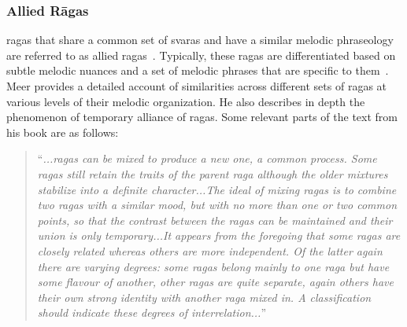 \subsubsection{Allied R\={a}gas}
\label{sec:allied_ragas}

\Glspl{raga} that share a common set of \glspl{svara} and have a similar melodic phraseology are referred to as allied \glspl{raga}~\citep{krishna2012carnatic}. Typically, these \glspl{raga} are differentiated based on subtle melodic nuances and a set of melodic phrases that are specific to them~\citep[p. 74-76]{meer1980hindustani}. Meer provides a detailed account of similarities across different sets of \glspl{raga} at various levels of their melodic organization. He also describes in depth the phenomenon of temporary alliance of \glspl{raga}. Some relevant parts of the text from his book are as follows: 

\blockquote{``\textit{...\Glspl{raga} can be mixed to produce a new one, a common process. Some \glspl{raga} still retain the traits of the parent \gls{raga} although the older mixtures stabilize into a definite character...The ideal of mixing \glspl{raga} is to combine two \glspl{raga} with a similar mood, but with no more than one or two common points, so that the contrast between the \glspl{raga} can be maintained and their union is only temporary...It appears from the foregoing that some \glspl{raga} are closely related whereas others are more independent. Of the latter again there are varying degrees: some \glspl{raga} belong mainly to one \gls{raga} but have some flavour of another, other \glspl{raga} are quite separate, again others have their own strong identity with another \gls{raga} mixed in. A classification should indicate these degrees of interrelation...}''}






